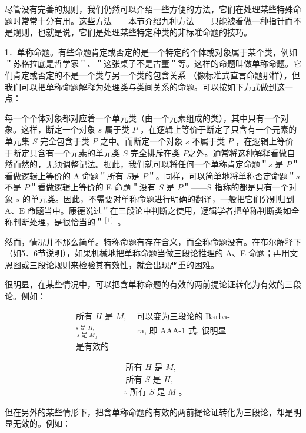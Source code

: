尽管没有完善的规则，我们仍然可以介绍一些方便的方法，它们在处理某些特殊命题时常常十分有用。这些方法——本节介绍九种方法——只能被看做一种指针而不是规则，也就是说，它们是处理某些特定种类的非标准命题的技巧。

1．单称命题。有些命题肯定或否定的是一个特定的个体或对象属于某个类，例如＂苏格拉底是哲学家＂、＂这张桌子不是古董＂等。这样的命题叫做单称命题。它们肯定或否定的不是一个类与另一个类的包含关系 （像标准式直言命题那样），但我们可以把单称命题解释为处理类与类间关系的命题。可以按如下方式做到这一点：

每一个个体对象都对应着一个单元类（由一个元素组成的类），其中只有一个对象。这样，断定一个对象 $s$ 属于类 $P$ ，在逻辑上等价于断定了只含有一个元素的单元集 $S$ 完全包含于类 $P$ 之中。而断定一个对象 $s$ 不属于类 $P$ ，在逻辑上等价于断定只含有一个元素的单元类 $S$ 完全排斥在类 $P$之外。通常将这种解释看做自然而然的，无须调整记法。据此，我们就可以将任何一个单称肯定命题＂$s$ 是 $P$＂看做逻辑上等价的 A 命题＂所有 $S$是 $P$＂。同样，可以简单地将单称否定命题＂$s$ 不是 $P$＂看做逻辑上等价的 E 命题＂没有 $S$ 是 $P$＂——S 指称的都是只有一个对象 $s$ 的单元类。因此，不需要对单称命题进行明确的翻译，一般把它们分别归到 $\mathrm{A} 、 \mathrm{E}$ 命题当中。康德说过＂在三段论中判断之使用，逻辑学者把单称判断类如全称判断处理，是很恰当的＂${ }^{[1]}$ 。

然而，情况并不那么简单。特称命题有存在含义，而全称命题没有。在布尔解释下（如5．6节说明），如果机械地把单称命题当做三段论推理的 A、E 命题；再用文恩图或三段论规则来检验其有效性，就会出现严重的困难。

很明显，在某些情况中，可以把含单称命题的有效的两前提论证转化为有效的三段论。例如：

$$
\begin{array}{ll}
\text { 所有 } H \text { 是 } M, & \text { 可以变为三段论的 Barba- } \\
\frac{s \text { 是 } H,}{\therefore s \text { 是 } M_{0}} & \text { ra, 即 AAA-1 式, 很明显 } \\
\text { 是有效的 } &
\end{array}
$$

$$
\begin{aligned}
& \text { 所有 } H \text { 是 } M, \\
& \text { 所有 } S \text { 是 } H, \\
& \therefore \text { 所有 } S \text { 是 } M \text { 。 }
\end{aligned}
$$

但在另外的某些情形下，把含单称命题的有效的两前提论证转化为三段论，却是明显无效的。例如：

